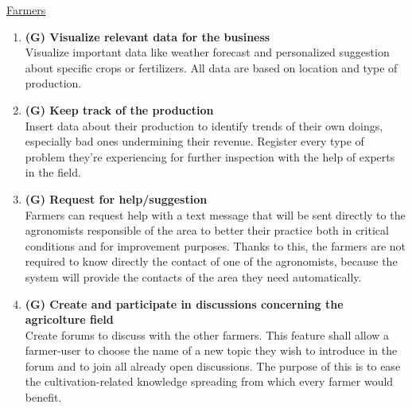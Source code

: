 \documentclass[table, 12pt]{article}
\begin{document}
\underline{Farmers}
\begin{enumerate}
    \item \textbf{(G) Visualize relevant data for the business}\\
    Visualize important data like weather forecast and personalized suggestion about specific crops or fertilizers.
    All data are based on location and type of production.
    \item \textbf{(G) Keep track of the production}\\
    Insert data about their production to identify trends of their own doings, especially bad ones undermining their revenue. Register every type of problem they're experiencing for further inspection with the help of experts in the field.
    \item \textbf{(G) Request for help/suggestion}\\
    Farmers can request help with a text message that will be sent directly to the agronomists responsible of the area to better their practice both in critical conditions and for improvement purposes. Thanks to this, the farmers are not required to know directly the contact of one of the agronomists, because the system will provide the contacts of the area they need automatically.
    \item \textbf{(G) Create and participate in discussions concerning the agricolture field}\\
    Create forums to discuss with the other farmers. This feature shall allow a farmer-user to choose the name of a new topic they wish to introduce in the forum and to join all already open discussions. The purpose of this is to ease the cultivation-related knowledge spreading from which every farmer would benefit.
\end{enumerate}
\end{document}
